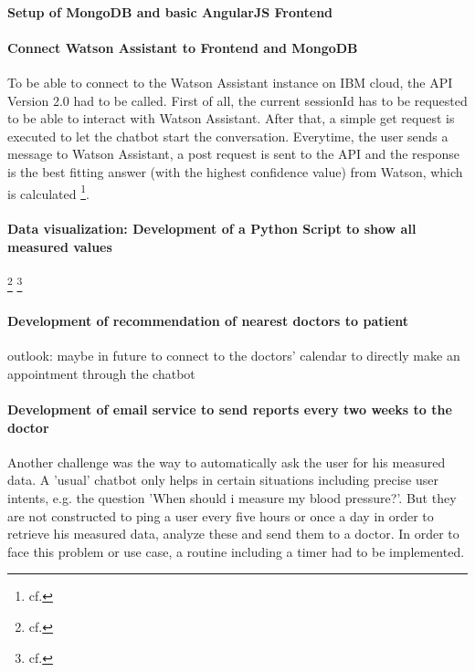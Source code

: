 \paragraph{Setup of MongoDB and basic AngularJS Frontend}

\paragraph{Connect Watson Assistant to Frontend and MongoDB}

To be able to connect to the Watson Assistant instance on IBM cloud, the API Version 2.0 had to be called. First of all, the current sessionId has to be requested to be able to interact with Watson Assistant. After that, a simple get request is executed to let the chatbot start the conversation. Everytime, the user sends a message to Watson Assistant, a post request is sent to the API and the response is the best fitting answer (with the highest confidence value) from Watson, which is calculated \footnote{cf.\autocite{wa_api_v2}}.

\paragraph{Data visualization: Development of a Python Script to show all measured values}
\footnote{cf.\autocite{kaggle}}
\footnote{cf.\autocite{decision_tree_python}}


\paragraph{Development of recommendation of nearest doctors to patient}
outlook: maybe in future to connect to the doctors' calendar to directly make an appointment through the chatbot

\paragraph{Development of email service to send reports every two weeks to the doctor}

Another challenge was the way to automatically ask the user for his measured data. A 'usual' chatbot only helps in certain situations including precise user intents, e.g. the question 'When should i measure my blood pressure?'. But they are not constructed to ping a user every five hours or once a day in order to retrieve his measured data, analyze these and send them to a doctor. 
In order to face this problem or use case, a routine including a timer had to be implemented.

